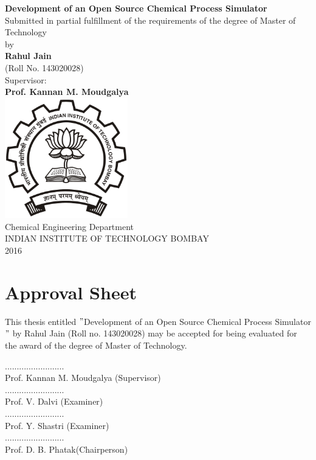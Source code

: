 \documentclass[12pt]{report}
\begin{document}
\begin{titlepage}
\begin{center}
\vspace*{1cm}
\huge
\textbf{Development of an Open Source Chemical Process Simulator} \\
\vspace*{0.7cm}
\Large
Submitted in partial fulfillment of the requirements of the degree of Master of Technology \\
\vspace{0.5cm}
\Large
by \\
\vspace{0.4cm}
\LARGE
\textbf{Rahul Jain} \\
(Roll No. 143020028) \\
\vspace{0.8cm}
\LARGE
Supervisor: \\
\textbf{Prof. Kannan M. Moudgalya} \\
\vspace{1cm}
\includegraphics[width=0.4\textwidth]{university} \\
\vspace{1cm}
\Large
Chemical Engineering Department \\
\vspace{0.5cm}
INDIAN INSTITUTE OF TECHNOLOGY BOMBAY \\
2016
\end{center}
\end{titlepage}

\section*{Approval Sheet}
This thesis entitled $"$Development of an Open Source Chemical Process Simulator$"$ by Rahul Jain (Roll no. 143020028) may be accepted for being evaluated for the award of the degree of Master of Technology. \\
\vspace{1.5cm}
\begin{flushright}
......................... \\
Prof. Kannan M. Moudgalya (Supervisor) \\
\vspace {1cm}
......................... \\
Prof. V. Dalvi (Examiner) \\
\vspace {1cm}
......................... \\
Prof. Y. Shastri (Examiner) \\
\vspace {1cm}
......................... \\
Prof. D. B. Phatak(Chairperson) \\
\end{flushright}
\end{document}
